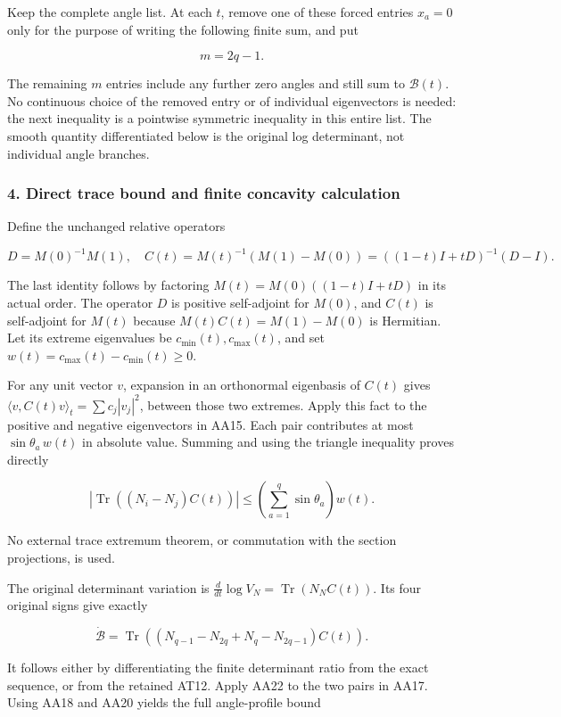 Keep the complete angle list. At each \(t\), remove one of these forced entries \(x_a=0\) only for the purpose of writing the following finite sum, and put

\[
m=2q-1.
\tag{AA20}
\]

The remaining \(m\) entries include any further zero angles and still sum to \(\mathcal B(t)\). No continuous choice of the removed entry or of individual eigenvectors is needed: the next inequality is a pointwise symmetric inequality in this entire list. The smooth quantity differentiated below is the original log determinant, not individual angle branches.

\subsubsection{4. Direct trace bound and finite concavity calculation}\label{endpoint-all_degree_angle_review--direct-trace-bound-and-finite-concavity-calculation}

Define the unchanged relative operators

\[
D=M(0)^{-1}M(1),\quad
C(t)=M(t)^{-1}(M(1)-M(0))
=((1-t)I+tD)^{-1}(D-I).
\tag{AA21}
\]

The last identity follows by factoring \(M(t)=M(0)((1-t)I+tD)\) in its actual order. The operator \(D\) is positive self-adjoint for \(M(0)\), and \(C(t)\) is self-adjoint for \(M(t)\) because \(M(t)C(t)=M(1)-M(0)\) is Hermitian. Let its extreme eigenvalues be \(c_{\min}(t),c_{\max}(t)\), and set \(w(t)=c_{\max}(t)-c_{\min}(t)\ge0\).

For any unit vector \(v\), expansion in an orthonormal eigenbasis of \(C(t)\) gives \(\langle v,C(t)v\rangle_t=\sum c_j|v_j|^2\), between those two extremes. Apply this fact to the positive and negative eigenvectors in AA15. Each pair contributes at most \(\sin\theta_a\,w(t)\) in absolute value. Summing and using the triangle inequality proves directly

\[
|\operatorname{Tr}((N_i-N_j)C(t))|
\le\left(\sum_{a=1}^q\sin\theta_a\right)w(t).
\tag{AA22}
\]

No external trace extremum theorem, or commutation with the section projections, is used.

The original determinant variation is \(\frac d{dt}\log V_N=\operatorname{Tr}(N_N C(t))\). Its four original signs give exactly

\[
\dot{\mathcal B}
=\operatorname{Tr}((N_{q-1}-N_{2q}+N_q-N_{2q-1})C(t)).
\tag{AA23}
\]

It follows either by differentiating the finite determinant ratio from the exact sequence, or from the retained AT12. Apply AA22 to the two pairs in AA17. Using AA18 and AA20 yields the full angle-profile bound


